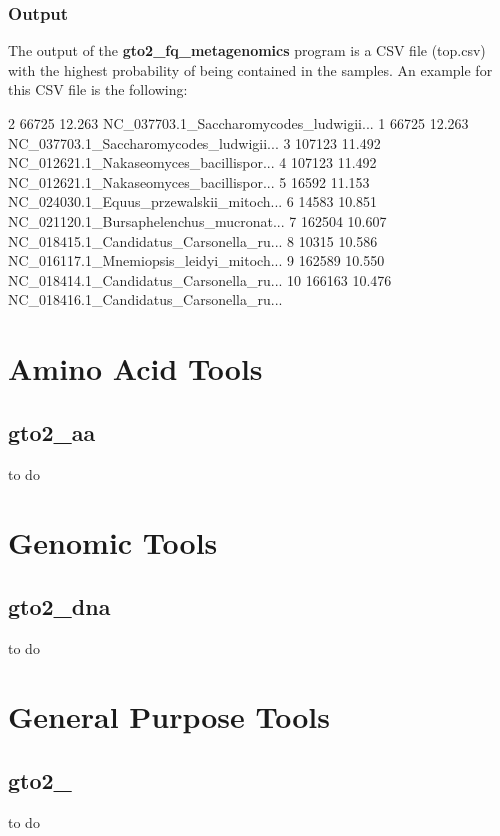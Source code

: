 \documentclass[11pt,]{krantz}
\newenvironment{Shaded}{\begin{snugshade}}{\end{snugshade}}
\newcommand{\ExtensionTok}[1]{#1}
\newcommand{\NormalTok}[1]{#1}
\begin{document}
\subsection*{Output}\label{output-26}


The output of the \textbf{gto2\_fq\_metagenomics} program is a CSV file
(top.csv) with the highest probability of being contained in the
samples. An example for this CSV file is the following:

\begin{Shaded}
\begin{Highlighting}[]
\ExtensionTok{2}\NormalTok{  66725   12.263   NC_037703.1_Saccharomycodes_ludwigii...}
\ExtensionTok{1}\NormalTok{  66725   12.263   NC_037703.1_Saccharomycodes_ludwigii...}
\ExtensionTok{3}\NormalTok{  107123  11.492   NC_012621.1_Nakaseomyces_bacillispor...}
\ExtensionTok{4}\NormalTok{  107123  11.492   NC_012621.1_Nakaseomyces_bacillispor...}
\ExtensionTok{5}\NormalTok{  16592   11.153   NC_024030.1_Equus_przewalskii_mitoch...}
\ExtensionTok{6}\NormalTok{  14583   10.851   NC_021120.1_Bursaphelenchus_mucronat...}
\ExtensionTok{7}\NormalTok{  162504  10.607   NC_018415.1_Candidatus_Carsonella_ru...}
\ExtensionTok{8}\NormalTok{  10315   10.586   NC_016117.1_Mnemiopsis_leidyi_mitoch...}
\ExtensionTok{9}\NormalTok{  162589  10.550   NC_018414.1_Candidatus_Carsonella_ru...}
\ExtensionTok{10}\NormalTok{ 166163  10.476   NC_018416.1_Candidatus_Carsonella_ru...}
\end{Highlighting}
\end{Shaded}

\chapter{Amino Acid Tools}\label{amino-acid-tools}

\section{gto2\_aa}\label{gto2_aa}

to do

\chapter{Genomic Tools}\label{genomic-tools}

\section{gto2\_dna}\label{gto2_dna}

to do

\chapter{General Purpose Tools}\label{general-purpose-tools}

\section{gto2\_}\label{gto2_}

to do



\printindex
\end{document}
